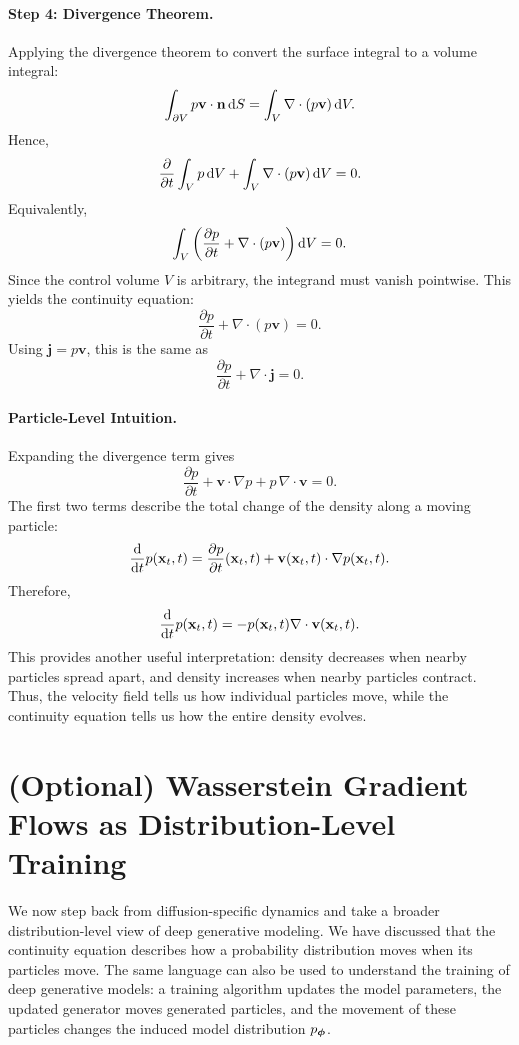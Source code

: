 \paragraph{Step 4: Divergence Theorem.}  
Applying the divergence theorem to convert the surface integral to a volume integral:
\[
\int_{\partial V} p \mathbf{v} \cdot \mathbf{n} \mathop{}\!\mathrm{d} S = \int_V \nabla \cdot (p \mathbf{v}) \mathop{}\!\mathrm{d} V.
\]
Hence,
\[
\frac{\partial}{\partial t} \int_V p \mathop{}\!\mathrm{d} V + \int_V \nabla \cdot (p \mathbf{v}) \mathop{}\!\mathrm{d} V = 0.
\]
Equivalently,
\[
\int_V \left(\frac{\partial p}{\partial t}+\nabla\cdot(p\mathbf{v})\right)\mathop{}\!\mathrm{d} V=0.
\]
Since the control volume $V$ is arbitrary, the integrand must vanish pointwise. This yields the continuity equation:
\[
\frac{\partial p}{\partial t}+\nabla\cdot(p\mathbf{v})=0.
\]
Using $\mathbf{j}=p\mathbf{v}$, this is the same as
\[
\frac{\partial p}{\partial t}+\nabla\cdot\mathbf{j}=0.
\]

\paragraph{Particle-Level Intuition.}
Expanding the divergence term gives
\[
\frac{\partial p}{\partial t}
+
\mathbf{v}\cdot\nabla p
+
p\,\nabla\cdot\mathbf{v}
=
0.
\]
The first two terms describe the total change of the density along a moving particle:
\[
\frac{\mathop{}\!\mathrm{d}}{\mathop{}\!\mathrm{d} t}p(\mathbf{x}_t,t)
=
\frac{\partial p}{\partial t}(\mathbf{x}_t,t)
+
\mathbf{v}(\mathbf{x}_t,t)\cdot\nabla p(\mathbf{x}_t,t).
\]
Therefore,
\[
\frac{\mathop{}\!\mathrm{d}}{\mathop{}\!\mathrm{d} t}p(\mathbf{x}_t,t)
=
-
p(\mathbf{x}_t,t)\nabla\cdot\mathbf{v}(\mathbf{x}_t,t).
\]
This provides another useful interpretation: density decreases when nearby particles spread apart, and density increases when nearby particles contract. Thus, the velocity field tells us how individual particles move, while the continuity equation tells us how the entire density evolves.

\clearpage
\newpage

\section{(Optional) Wasserstein Gradient Flows as Distribution-Level Training}
\label{sec:wgf-distribution-level-training}

We now step back from diffusion-specific dynamics and take a broader
distribution-level view of deep generative modeling.  We have discussed that the continuity equation describes how a probability
distribution moves when its particles move.   The same language can also be used
to understand the training of deep generative models: a training algorithm updates
the model parameters, the updated generator moves generated particles, and the
movement of these particles changes the induced model distribution
$p_{{\bm{\phi}}}$.


